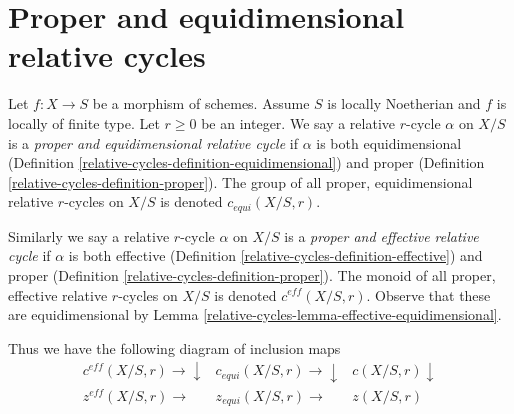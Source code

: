 \section{Proper and equidimensional relative cycles}
\label{relative-cycles-section-proper-equidimensional}
Let $f : X \to S$ be a morphism of schemes. Assume $S$ is locally Noetherian
and $f$ is locally of finite type. Let $r \geq 0$ be an integer. We say a
relative $r$-cycle $\alpha$ on $X/S$ is a {\it proper and equidimensional
relative cycle} if $\alpha$ is both equidimensional
(Definition \ref{relative-cycles-definition-equidimensional})
and proper (Definition \ref{relative-cycles-definition-proper}).
The group of all proper, equidimensional relative $r$-cycles on $X/S$ is
denoted $c_{equi}(X/S, r)$.

\medskip\noindent
Similarly we say a relative $r$-cycle $\alpha$ on $X/S$ is a
{\it proper and effective relative cycle} if $\alpha$ is both effective
(Definition \ref{relative-cycles-definition-effective}) and proper
(Definition \ref{relative-cycles-definition-proper}).
The monoid of all proper, effective relative $r$-cycles on $X/S$ is
denoted $c^{eff}(X/S, r)$.
Observe that these are equidimensional by
Lemma \ref{relative-cycles-lemma-effective-equidimensional}.

\medskip\noindent
Thus we have the following diagram of inclusion maps
$$
\begin{array}{ccc}c^{eff}(X/S, r) \longrightarrow\downarrow & c_{equi}(X/S, r) \longrightarrow\downarrow & c(X/S, r) \downarrow \\ z^{eff}(X/S, r) \longrightarrow & z_{equi}(X/S, r) \longrightarrow & z(X/S, r)\end{array}
$$

